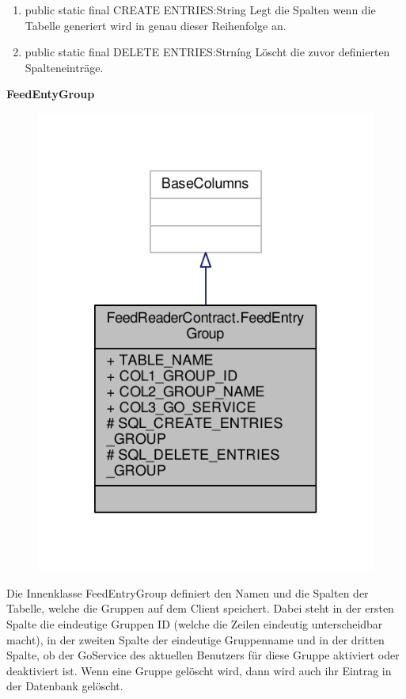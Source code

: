 \begin{enumerate}
	\item public static final CREATE ENTRIES:String
		Legt die Spalten wenn die Tabelle generiert wird in genau dieser Reihenfolge an.
	\item public static final DELETE ENTRIES:Strníng
		Löscht die zuvor definierten Spalteneinträge.
\end{enumerate}

\textbf{FeedEntyGroup}
\begin{figure}[H]
	\includegraphics[scale = 1]{res/umlClasses/feed_reader_contract_group.pdf}
	\centering
\end{figure}
Die Innenklasse FeedEntryGroup definiert den Namen und die Spalten der Tabelle, welche die Gruppen auf dem Client speichert. 
Dabei steht in der ersten Spalte die eindeutige Gruppen ID (welche die Zeilen eindeutig unterscheidbar macht), in der zweiten Spalte der eindeutige Gruppenname und in der dritten Spalte, ob der GoService des aktuellen Benutzers für diese Gruppe aktiviert oder deaktiviert ist.
Wenn eine Gruppe gelöscht wird, dann wird auch ihr Eintrag in der Datenbank gelöscht.

